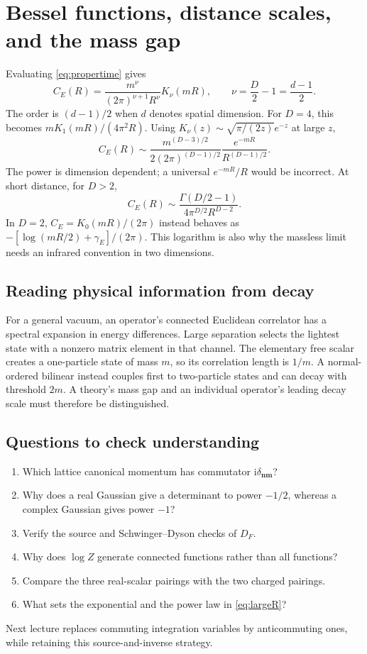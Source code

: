 \documentclass[11pt]{article}
\newcommand{\ii}{\mathrm i}
\newcommand{\module}[1]{\clearpage\section{#1}}
\begin{document}
\module{Bessel functions, distance scales, and the mass gap}
Evaluating \eqref{eq:propertime} gives
\begin{equation}
 C_E(R)=\frac{m^\nu}{(2\pi)^{\nu+1}R^\nu}K_\nu(mR),
 \qquad \nu=\frac D2-1=\frac{d-1}{2}.                \label{eq:bessel}
\end{equation}
The order is \((d-1)/2\) when \(d\) denotes spatial dimension.
For \(D=4\), this becomes \(mK_1(mR)/(4\pi^2R)\).
Using \(K_\nu(z)\sim\sqrt{\pi/(2z)}e^{-z}\) at large \(z\),
\begin{equation}
 C_E(R)\sim
 \frac{m^{(D-3)/2}}{2(2\pi)^{(D-1)/2}}
 \frac{e^{-mR}}{R^{(D-1)/2}}.
                                                        \label{eq:largeR}
\end{equation}
The power is dimension dependent; a universal \(e^{-mR}/R\)
would be incorrect. At short distance, for \(D>2\),
\begin{equation}
 C_E(R)\sim\frac{\Gamma(D/2-1)}{4\pi^{D/2}R^{D-2}}.
\end{equation}
In \(D=2\), \(C_E=K_0(mR)/(2\pi)\) instead behaves as
\(-[\log(mR/2)+\gamma_E]/(2\pi)\). This logarithm is also why
the massless limit needs an infrared convention in two dimensions.

\subsection{Reading physical information from decay}
For a general vacuum, an operator's connected Euclidean correlator
has a spectral expansion in energy differences. Large separation
selects the lightest state with a nonzero matrix element in that
channel. The elementary free scalar creates a one-particle state of
mass \(m\), so its correlation length is \(1/m\). A normal-ordered
bilinear instead couples first to two-particle states and can decay
with threshold \(2m\). A theory's mass gap and an individual
operator's leading decay scale must therefore be distinguished.

\subsection*{Questions to check understanding}
\begin{enumerate}
\item Which lattice canonical momentum has commutator \(\ii\delta_{\bm n\bm m}\)?
\item Why does a real Gaussian give a determinant to power \(-1/2\),
whereas a complex Gaussian gives power \(-1\)?
\item Verify the source and Schwinger--Dyson checks of \(D_F\).
\item Why does \(\log Z\) generate connected functions rather than all functions?
\item Compare the three real-scalar pairings with the two charged pairings.
\item What sets the exponential and the power law in \eqref{eq:largeR}?
\end{enumerate}
Next lecture replaces commuting integration variables by anticommuting
ones, while retaining this source-and-inverse strategy.
\end{document}
